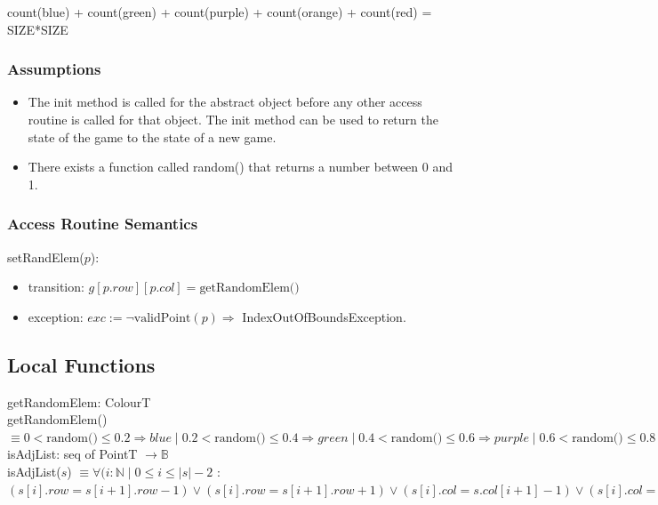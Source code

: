\documentclass[12pt]{article}
\begin{document}
count(blue) + count(green) + count(purple) + count(orange) + count(red) = SIZE*SIZE

\subsubsection* {Assumptions}

\begin{itemize}

\item The init method is called for the abstract object before any other access routine is called for that object. The init method can be used to return the state of the game to the state of a new game.

\item There exists a function called random() that returns a number between 0 and 1.
\end{itemize}
\subsubsection*{Access Routine Semantics}

\noindent setRandElem($p$):

\begin{itemize}

\item transition: $g[p.row][p.col] = \mbox{getRandomElem()}$

\item exception: $exc:= \lnot \mbox{validPoint}(p) \Rightarrow$ IndexOutOfBoundsException.

\end{itemize}

\newpage

\subsection*{Local Functions}

\noindent getRandomElem: ColourT\\
getRandomElem() $\equiv 0 < \mbox{random()} \le 0.2  \Rightarrow blue \mid 0.2 < \mbox{random()} \le 0.4 \Rightarrow green \mid 0.4 < \mbox{random()} \le 0.6 \Rightarrow purple \mid 0.6 < \mbox{random()} \le 0.8 \Rightarrow orange \mid 0.8 < \mbox{random()} \le 1.0 \Rightarrow red$\\

\noindent isAdjList: seq of PointT $\rightarrow \mathbb{B}$\\
isAdjList($s$) $\equiv \forall(i:\mathbb{N} \mid 0 \le i \le \lvert s\rvert - 2$ : $(s[i].row = s[i+1].row-1) \lor (s[i].row=s[i+1].row+1) \lor (s[i].col=s.col[i+1]-1) \lor (s[i].col=s[i+1].col+1) \land \lnot((s[i].row = s[i+1].row +1)\land (s[i].col = s[i+1].col+1))\land \lnot ((s[i].row = s[i+1].row-1)\land (s[i].col = s[i+1].col-1))$\\
\end{document}
